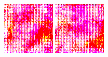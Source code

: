 \documentclass[11pt]{article}
\numberwithin{equation}{section}
\begin{document}
\begin{figure}[h]
	\hfill
	\includegraphics[width=0.24\textwidth]{LatentDiffusion/diffusion-samples/ddim32/sample_7.png}
	\hfill
	\includegraphics[width=0.24\textwidth]{LatentDiffusion/diffusion-samples/ddim32/sample_8.png}%
\end{figure}
\end{document}
